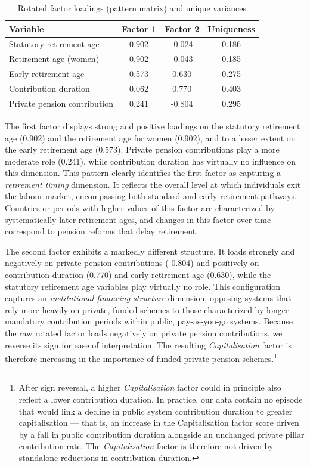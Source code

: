 \documentclass[11pt,english,a4paper, twoside, authoryear]{article}
\begin{document}
\begin{table}[h!]
\centering
\caption{Rotated factor loadings (pattern matrix) and unique variances}
\label{tab:pcfa_loadings}
\vspace{-0.3cm}
\begin{tabular}{lccc}
\hline
Variable & Factor 1 & Factor 2 & Uniqueness \\
\hline
Statutory retirement age      &  0.902 & -0.024 & 0.186 \\
Retirement age (women)        &  0.902 & -0.043 & 0.185 \\
Early retirement age          &  0.573 &   0.630  & 0.275 \\
Contribution duration         &  0.062 &   0.770  & 0.403 \\
Private pension contribution  &  0.241 & -0.804 & 0.295 \\
\hline
\end{tabular}
\end{table}

The first factor displays strong and positive loadings on the statutory retirement age (0.902) and the retirement age for women (0.902), and to a lesser extent on the early retirement age (0.573). Private pension contributions play a more moderate role (0.241), while contribution duration has virtually no influence on this dimension. This pattern clearly identifies the first factor as capturing a \emph{retirement timing} dimension. It reflects the overall level at which individuals exit the labour market, encompassing both standard and early retirement pathways. Countries or periods with higher values of this factor are characterized by systematically later retirement ages, and changes in this factor over time correspond to pension reforms that delay retirement.

The second factor exhibits a markedly different structure. It loads strongly and negatively on private pension contributions (-0.804) and positively on contribution duration (0.770) and early retirement age (0.630), while the statutory retirement age variables play virtually no role. This configuration captures an \emph{institutional financing structure} dimension, opposing systems that rely more heavily on private, funded schemes to those characterized by longer mandatory contribution periods within public, pay-as-you-go systems. Because the raw rotated factor loads negatively on private pension contributions, we reverse its sign for ease of interpretation. The resulting \emph{Capitalisation} factor is therefore increasing in the importance of funded private pension schemes.\footnote{After sign reversal, a higher \emph{Capitalisation} factor could in principle also reflect a lower contribution duration. In practice, our data contain no episode that would link a decline in public system contribution duration to greater capitalisation — that is, an increase in the Capitalisation factor score driven by a fall in public contribution duration alongside an unchanged private pillar contribution rate. The \emph{Capitalisation} factor is therefore not driven by standalone reductions in contribution duration.}
\end{document}
